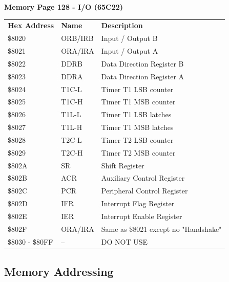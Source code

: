 \documentclass{ol-softwaremanual}
\begin{document}
\begin{table}[H]
\centering
\textbf{Memory Page 128 - I/O (65C22)}\\
\begin{tabular}{|l|l|l|}
\cline{1-3}
\textbf{Hex Address} & \textbf{Name} & \textbf{Description}  \\ \cline{1-3}
\$8020 & ORB/IRB & Input / Output B\\ \cline{1-3}
\$8021 & ORA/IRA & Input / Output A\\ \cline{1-3}
\$8022 & DDRB & Data Direction Register B\\ \cline{1-3}
\$8023 & DDRA & Data Direction Register A\\ \cline{1-3}
\$8024 & T1C-L & Timer T1 LSB counter\\ \cline{1-3}
\$8025 & T1C-H & Timer T1 MSB counter\\ \cline{1-3}
\$8026 & T1L-L & Timer T1 LSB latches\\ \cline{1-3}
\$8027 & T1L-H & Timer T1 MSB latches\\ \cline{1-3}
\$8028 & T2C-L & Timer T2 LSB counter\\ \cline{1-3}
\$8029 & T2C-H & Timer T2 MSB counter\\ \cline{1-3}
\$802A & SR & Shift Register\\ \cline{1-3}
\$802B & ACR & Auxiliary Control Register\\ \cline{1-3}
\$802C & PCR & Peripheral Control Register\\ \cline{1-3}
\$802D & IFR & Interrupt Flag Register\\ \cline{1-3}
\$802E & IER & Interrupt Enable Register\\ \cline{1-3}
\$802F & ORA/IRA & Same as \$8021 except no "Handshake"\\ \cline{1-3}
\$8030 - \$80FF & -- &  DO NOT USE\\ \cline{1-3}
\end{tabular}
\end{table}

\pagebreak
\subsection{Memory Addressing}
\end{document}
